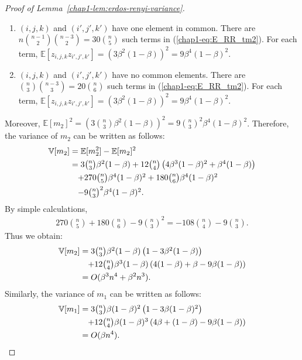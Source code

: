 \begin{proof}[Proof of Lemma~\ref{chap1-lem:erdos-renyi-variance}]
\begin{enumerate}
	\item $(i,j,k)$ and $(i',j',k')$ have one element in common. 
	There are $n \binom{n-1}{2} \binom{n-3}{2} = 30\binom{n}{5}$ such terms in (\ref{chap1-eq:E_RR_tm2}).  For each term, $\mathbb{E}[z_{i,j,k}z_{i',j',k'}]=(3\beta^2(1-\beta))^2 = 9\beta^4(1-\beta)^2$. 
	\item $(i,j,k)$ and $(i',j',k')$ have no common elements. 
	There are $\binom{n}{3}\binom{n-3}{3} = 20\binom{n}{6}$ such terms in (\ref{chap1-eq:E_RR_tm2}). 
	For each term, $\mathbb{E}[z_{i,j,k}z_{i',j',k'}]=(3\beta^2(1-\beta))^2 = 9\beta^4(1-\beta)^2$. 
\end{enumerate}
Moreover, $\mathbb{E}[m_2]^2 = (3\binom{n}{3}\beta^2(1-\beta))^2 = 9\binom{n}{3}^2\beta^4(1-\beta)^2$. 
Therefore, the variance of $m_2$ can be written as follows:
\begin{align*}
  \mathbb{V}[m_2] 
  &= \mathbb{E}[m_2^2] - \mathbb{E}[m_2]^2 \nonumber\\
  &= \textstyle{3\binom{n}{3}\beta^2(1-\beta) + 12\binom{n}{4}\left(4\beta^3(1-\beta)^2 + \beta^4(1-\beta)\right)} \nonumber\\
  &\hspace{3.5mm} \textstyle{+ 270\binom{n}{5}\beta^4(1-\beta)^2 + 180\binom{n}{6}\beta^4(1-\beta)^2} \nonumber\\
  &\hspace{3.5mm} \textstyle{- 9\binom{n}{3}^2\beta^4(1-\beta)^2.}
\end{align*}
By simple calculations,
\begin{align*}
\textstyle{270\binom{n}{5} + 180\binom{n}{6} - 9\binom{n}{3}^2 = -108\binom{n}{4}-9\binom{n}{3}.}
\end{align*}
Thus we obtain:
\begin{align*}
\mathbb{V}[m_2] 
&= \textstyle{3\binom{n}{3}\beta^2(1-\beta)\left(1 - 3\beta^2(1-\beta)\right)} \nonumber\\
&\hspace{3.5mm} \textstyle{+ 12\binom{n}{4} \beta^3(1-\beta) \left(4(1-\beta) + \beta - 9\beta(1-\beta) \right)} \\
&= O(\beta^3 n^4 + \beta^2n^3).
\end{align*}
Similarly, the variance of $m_1$ can be written as follows:
\begin{align*}
\mathbb{V}[m_1] 
&= \textstyle{3\binom{n}{3}\beta(1-\beta)^2\left(1 - 3\beta(1-\beta)^2\right)} \nonumber\\
&\hspace{3.5mm} \textstyle{+ 12\binom{n}{4} \beta(1-\beta)^3 \left(4\beta +
(1-\beta) - 9\beta(1-\beta) \right)} \\
&= O(\beta n^4).
\end{align*}
\end{proof}

